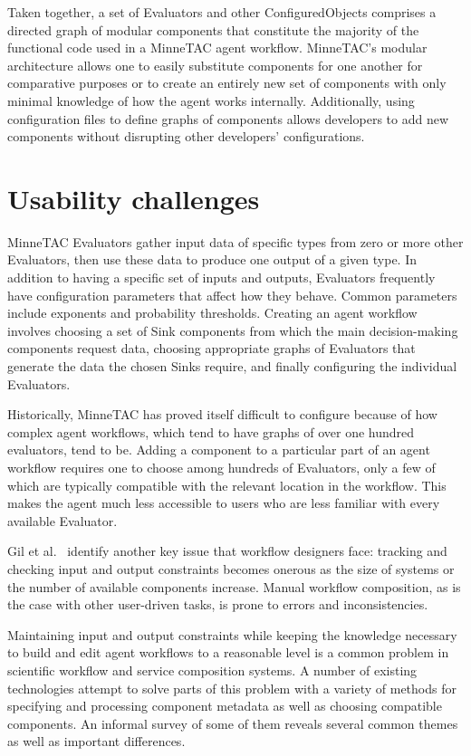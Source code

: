 \documentclass{article}
\begin{document}
Taken together, a set of Evaluators and other ConfiguredObjects comprises
a directed graph of modular components that constitute the majority
of the functional code used in a MinneTAC agent workflow.  MinneTAC's
modular architecture allows one to easily substitute components for one
another for comparative purposes or to create an entirely new set of
components with only minimal knowledge of how the agent works internally.
Additionally, using configuration files to define graphs of components
allows developers to add new components without disrupting other
developers' configurations.

\section{Usability challenges}

MinneTAC Evaluators gather input data of specific types from zero or
more other Evaluators, then use these data to produce one output of a
given type.  In addition to having a specific set of inputs and outputs,
Evaluators frequently have configuration parameters that affect how they
behave.  Common parameters include exponents and probability thresholds.
Creating an agent workflow involves choosing a set of Sink components
from which the main decision-making components request data, choosing
appropriate graphs of Evaluators that generate the data the chosen Sinks
require, and finally configuring the individual Evaluators.~\cite{Collins08TR}

Historically, MinneTAC has proved itself difficult to configure because of
how complex agent workflows, which tend to have graphs of over one hundred
evaluators, tend to be.  Adding a component to a particular part of an agent workflow requires one to choose among hundreds of Evaluators, only a few of which are typically compatible with the relevant location in the workflow.
This makes the agent much less accessible
to users who are less familiar with every available Evaluator.

Gil et al.~\cite{gil2010wings} identify another key issue that workflow
designers face: tracking and checking input and output constraints
becomes onerous as the size of systems or the number of available
components increase.  Manual workflow composition, as is the case
with other user-driven tasks, is prone to errors and inconsistencies.

Maintaining input and output constraints while keeping the knowledge
necessary to build and edit agent workflows to a reasonable level
is a common problem in
scientific workflow and service composition systems.  A number of
existing technologies attempt to solve parts of this problem with a
variety of methods for specifying and processing component metadata as
well as choosing compatible components.  An informal survey of some of
them reveals several common themes as well as important differences.
\end{document}
